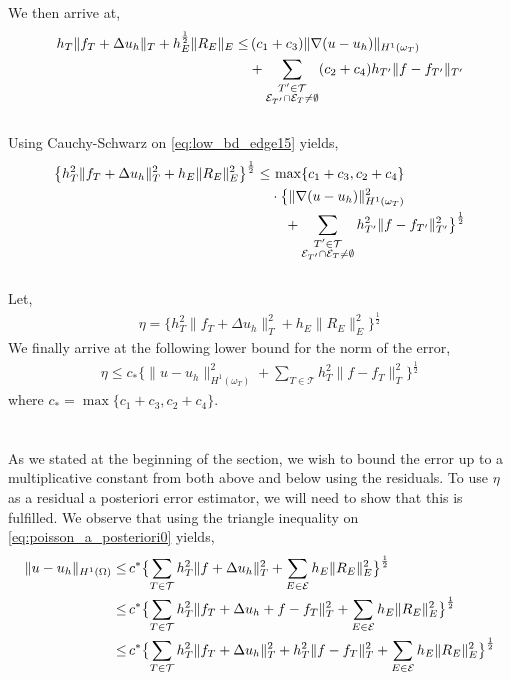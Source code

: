 We then arrive at,
\begin{align} \label{eq:low_bd_edge15}
h_T \| f_T + \Delta u_h\|_T + h_E^{\frac{1}{2}} \|R_E\|_E  \leq & \, (c_1 + c_3)\|\nabla(u-u_h) \|_{H^1(\omega_T)} \\
& +\displaystyle\sum_{\substack{T' \in \mathcal{T} \\ \mathcal{E}_{T'} \cap \mathcal{E}_{T} \neq \emptyset}} (c_2 + c_4)h_{T'} \|f-f_{T'}\|_{T'} \notag
\end{align}
\\
Using Cauchy-Schwarz on \eqref{eq:low_bd_edge15} yields,
\begin{align} \label{eq:low_bd_edge18}
\bigl\{ h_T^2 \| f_T + \Delta u_h\|^2_T + h_E \|R_E\|_E^2 \bigr\}^{\frac{1}{2}} \leq & \,\max\{c_1+c_3, c_2+c_4\} \\
& \cdot \bigl\{\|\nabla(u-u_h) \|^2_{H^1(\omega_T)} \notag \\
& \quad +\sum_{\substack{T' \in \mathcal{T} \\ \mathcal{E}_{T'} \cap \mathcal{E}_T \neq \emptyset}} h^2_{T'} \|f-f_{T'}\|^2_{T'} \bigr\}^{\frac{1}{2}} \notag 
\end{align}
\\
Let, 
\begin{align} \label{poisson:eta_2} 
\eta = \bigl\{h^2_T \| f_T + \Delta u_h\|^2_T + h_E \|R_E\|^2_E \bigr\}^{\frac{1}{2}}
\end{align}
We finally arrive at the following lower bound for the norm of the error,
\\
\begin{align} 
\eta \leq  c_* \bigl\{\|u-u_h\|^2_{H^1(\omega_T)} + \sum_{T \in \mathcal{T}} h_T^2\|f-f_T\|^2_T\bigr\}^{\frac{1}{2}}
\end{align}
where $c_* = \max\{c_1 + c_3, c_2+ c_4\}$. 
\\
\\
\\
As we stated at the beginning of the section, we wish to bound the error up to a multiplicative constant from both above and below using the residuals. To use $\eta$ as a residual a posteriori error estimator, we will need to show that this is fulfilled. We observe that using the triangle inequality on \eqref{eq:poisson_a_posteriori0} yields, 
\begin{align}
\| u - u_h \|_{H^1(\Omega)} \leq & \, c^* \bigl\{\sum_{T \in \mathcal{T}} h_T^2\| f + \Delta u_h\|^2_T + \sum_{E \in \mathcal{E}} h_E\| R_E \|^2_E \bigr\}^\frac{1}{2} \\
\leq & \, c^* \bigl\{\sum_{T \in \mathcal{T}} h_T^2\| f_T + \Delta u_h + f - f_T\|^2_T + \sum_{E \in \mathcal{E}} h_E\| R_E \|^2_E \bigr\}^\frac{1}{2} \notag\\
\leq & \, c^* \bigl\{\sum_{T \in \mathcal{T}} h_T^2\| f_T + \Delta u_h\|^2_T + h_T^2\|f - f_T\|^2_T + \sum_{E \in \mathcal{E}} h_E\| R_E \|^2_E \bigr\}^\frac{1}{2} \notag
\end{align}
